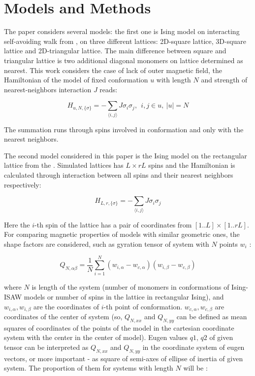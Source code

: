 \section{Models and Methods}
\label{sec:metmod}

The paper considers several models: the first one is Ising model on interacting self-avoiding walk from \cite{faizullina2021critical}, on three different lattices: 2D-square lattice, 3D-square lattice and 2D-triangular lattice. The main difference between square and triangular lattice is two additional diagonal monomers on lattice determined as nearest. This work considers the case of lack of outer magnetic field, the Hamiltonian of the model of fixed conformation $u$ with length $N$ and strength of nearest-neighbors interaction $J$ reads:

\begin{equation}\label{H_Ising_ISAW}
  H_{u, N, \{\sigma\}} = - \sum_{\langle i,j \rangle} J  \sigma_{i}  \sigma_{j},\ \ i,j \in u,\ |u| = N
\end{equation}

The summation runs through spins involved in conformation and only with the nearest neighbors. 

The second model considered in this paper is the Ising model on the rectangular lattice from the \cite{Selke2006}. Simulated lattices has $L \times rL$ spins and the Hamiltonian is calculated through interaction between all spins and their nearest neighbors respectively:

\begin{equation}\label{H_Ising_Rectan}
  H_{L, r, \{\sigma\}} = - \sum_{\langle i,j \rangle} J  \sigma_{i}  \sigma_{j}
\end{equation}

Here the $i$-th spin of the lattice has a pair of coordinates from $[1..L] \times [1..rL]$. For comparing magnetic properties of models with similar geometric ones, the shape factors are considered, such as gyration tensor of system with $N$ points $w_{i}$ \cite{Caracciolo2011}:

\begin{equation}\label{eq:Ten_G1}
    Q_{N,\alpha\beta} = \frac{1}{N} \sum^{N}_{i=1}(w_{i,\alpha} - w_{c, \alpha})(w_{i,\beta} - w_{c, \beta})
\end{equation}

where $N$ is length of the system (number of monomers in conformations of Ising-ISAW models or number of spins in the lattice in rectangular Ising), and  $w_{i, \alpha},w_{i, \beta}$ are the coordinates of $i$-th point of conformation. $w_{c, \alpha},w_{c, \beta}$ are coordinates of the center of system (so, $Q_{N, xx}$ and $Q_{N,yy}$ can be defined as mean squares of coordinates of the points of the model in the cartesian coordinate system with the center in the center of model). Eugen values $q1$, $q2$ of given tensor can be interpreted as $Q_{N, xx}$ and $Q_{N,yy}$ in the coordinate system of eugen vectors, or more important - as square of semi-axes of ellipse of inertia of given system. The proportion of them for systems with length $N$ will be \cite{Caracciolo2011}: 

